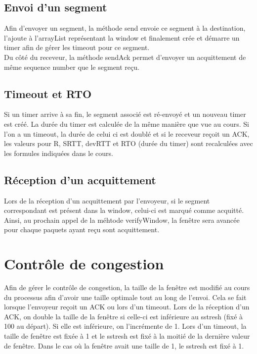\documentclass{article}
\begin{document}
\subsection{Envoi d'un segment}

Afin d'envoyer un segment, la méthode send envoie ce segment à la destination, l'ajoute à l'arrayList représentant la window et finalement crée et démarre un timer afin de gérer les timeout pour ce segment.\\
Du côté du receveur, la méthode sendAck permet d'envoyer un acquittement de même sequence number que le segment reçu.

\subsection{Timeout et RTO}

Si un timer arrive à sa fin, le segment associé est ré-envoyé et un nouveau timer est créé. 
La durée du timer est calculée de la même manière que vue au cours.
Si l'on a un timeout, la durée de celui ci est doublé et si le receveur reçoit un ACK, les valeurs pour R, SRTT, devRTT et RTO (durée du timer) sont recalculées avec les formules indiquées dans le cours.

\subsection{Réception d'un acquittement}

Lors de la réception d'un acquittement par l'envoyeur, si le segment correspondant est présent dans la window, celui-ci est marqué comme acquitté.
Ainsi, au prochain appel de la méhtode verifyWindow, la fenêtre sera avancée pour chaque paquets ayant reçu sont acquittement. 

\section{Contrôle de congestion}

Afin de gérer le contrôle de congestion, la taille de la fenêtre est modifié au cours du processus afin d'avoir une taille optimale tout au long de l'envoi.
Cela se fait lorsque l'envoyeur reçoit un ACK ou lors d'un timeout.
Lors de la réception d'un ACK, on double la taille de la fenêtre si celle-ci est inférieure au sstresh (fixé à 100 au départ). Si elle est inférieure, on l'incrémente de 1.
Lors d'un timeout, la taille de fenêtre est fixée à 1 et le sstresh est fixé à la moitié de la dernière valeur de fenêtre. Dans le cas où la fenêtre avait une taille de 1, le sstresh est fixé à 1.
\end{document}

